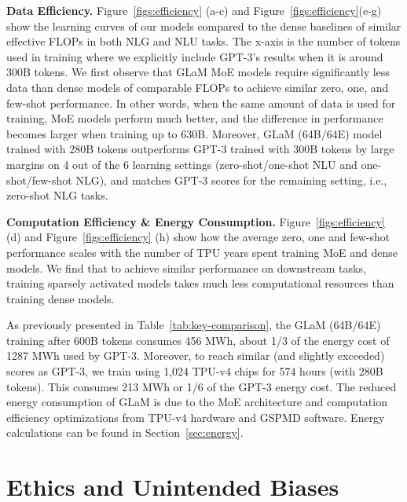 \textbf{Data Efficiency.}
Figure~\ref{figs:efficiency} (a-c) and Figure~\ref{figs:efficiency}(e-g) show the learning curves of our models compared to the dense baselines of similar effective FLOPs in both NLG and NLU tasks. The x-axis is the number of tokens used in training where we explicitly include GPT-3’s results when it is around 300B tokens. We first observe that GLaM MoE models require significantly less data than dense models of comparable FLOPs to achieve similar zero, one, and few-shot performance. In other words, when the same amount of data is used for training, MoE models perform much better, and the difference in performance becomes larger when training up to 630B. Moreover, GLaM (64B/64E) model trained with 280B tokens outperforms GPT-3 trained with 300B tokens by large margins on 4 out of the 6 learning settings (zero-shot/one-shot NLU and one-shot/few-shot NLG), and matches GPT-3 scores for the remaining setting, i.e., zero-shot NLG tasks. 

\textbf{Computation Efficiency \& Energy Consumption.}
Figure~\ref{figs:efficiency} (d) and Figure~\ref{figs:efficiency} (h) show how the average zero, one and few-shot performance scales with the number of TPU years spent training MoE and dense models. We find that to achieve similar performance on downstream tasks, training sparsely activated models takes much less computational resources than training dense models.

As previously presented in Table~\ref{tab:key-comparison}, the GLaM (64B/64E) training after 600B tokens consumes 456 MWh, about 1/3 of the energy cost of 1287 MWh used by GPT-3. Moreover, to reach similar (and slightly exceeded) scores as GPT-3, we train using 1,024 TPU-v4 chips for 574 hours (with 280B tokens). This consumes 213 MWh or 1/6 of the GPT-3 energy cost.  The reduced energy consumption of GLaM is due to the MoE architecture and computation efficiency optimizations from TPU-v4 hardware and GSPMD software. Energy calculations can be found in Section~\ref{sec:energy}.

\section{Ethics and Unintended Biases}
\label{sec:rai}


